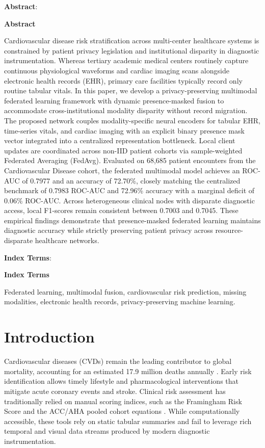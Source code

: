\documentclass[10pt,conference]{IEEEtran}
\makeatletter
\renewenvironment{abstract}{%
  \if@twocolumn
    \small\textbf{Abstract}: \ignorespaces
  \else
    \begin{center}\small\textbf{Abstract}\end{center}\quotation\small\ignorespaces
  \fi
}{%
  \if@twocolumn\par\vspace{1ex}\else\endquotation\fi
}
\newenvironment{keywords}{%
  \if@twocolumn
    \small\textbf{Index Terms}: \ignorespaces
  \else
    \begin{center}\small\textbf{Index Terms}\end{center}\quotation\small\ignorespaces
  \fi
}{%
  \if@twocolumn\par\vspace{1.5ex}\else\endquotation\fi
}
\makeatother
\begin{document}
\begin{abstract}
Cardiovascular disease risk stratification across multi-center healthcare systems is constrained by patient privacy legislation and institutional disparity in diagnostic instrumentation. Whereas tertiary academic medical centers routinely capture continuous physiological waveforms and cardiac imaging scans alongside electronic health records (EHR), primary care facilities typically record only routine tabular vitals. In this paper, we develop a privacy-preserving multimodal federated learning framework with dynamic presence-masked fusion to accommodate cross-institutional modality disparity without record migration. The proposed network couples modality-specific neural encoders for tabular EHR, time-series vitals, and cardiac imaging with an explicit binary presence mask vector integrated into a centralized representation bottleneck. Local client updates are coordinated across non-IID patient cohorts via sample-weighted Federated Averaging (FedAvg). Evaluated on 68,685 patient encounters from the Cardiovascular Disease cohort, the federated multimodal model achieves an ROC-AUC of 0.7977 and an accuracy of 72.70\%, closely matching the centralized benchmark of 0.7983 ROC-AUC and 72.96\% accuracy with a marginal deficit of 0.06\% ROC-AUC. Across heterogeneous clinical nodes with disparate diagnostic access, local F1-scores remain consistent between 0.7003 and 0.7045. These empirical findings demonstrate that presence-masked federated learning maintains diagnostic accuracy while strictly preserving patient privacy across resource-disparate healthcare networks.
\end{abstract}

\begin{keywords}
Federated learning, multimodal fusion, cardiovascular risk prediction, missing modalities, electronic health records, privacy-preserving machine learning.
\end{keywords}

\section{Introduction}
Cardiovascular diseases (CVDs) remain the leading contributor to global mortality, accounting for an estimated 17.9 million deaths annually \cite{who2021cvr}. Early risk identification allows timely lifestyle and pharmacological interventions that mitigate acute coronary events and stroke. Clinical risk assessment has traditionally relied on manual scoring indices, such as the Framingham Risk Score \cite{wilson1998prediction} and the ACC/AHA pooled cohort equations \cite{goff20142013}. While computationally accessible, these tools rely on static tabular summaries and fail to leverage rich temporal and visual data streams produced by modern diagnostic instrumentation.
\end{document}
